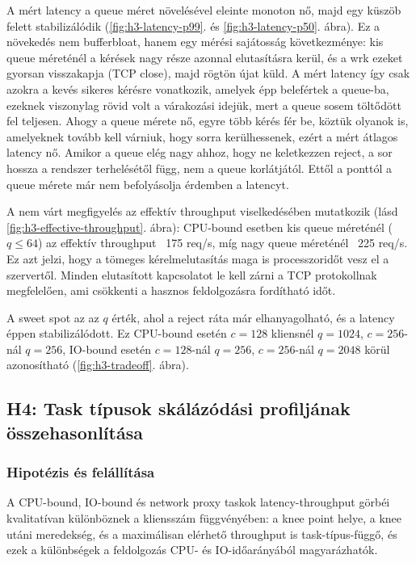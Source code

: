 \documentclass[11pt,a4paper]{article}
\begin{document}
A mért latency a queue méret növelésével eleinte monoton nő, majd egy küszöb felett
stabilizálódik (\ref{fig:h3-latency-p99}. és \ref{fig:h3-latency-p50}. ábra).
Ez a növekedés nem bufferbloat, hanem egy mérési sajátosság következménye: kis
queue méreténél a kérések nagy része azonnal elutasításra kerül, és a wrk ezeket
gyorsan visszakapja (TCP close), majd rögtön újat küld. A mért latency így csak
azokra a kevés sikeres kérésre vonatkozik, amelyek épp belefértek a queue-ba,
ezeknek viszonylag rövid volt a várakozási idejük, mert a queue sosem töltődött
fel teljesen. Ahogy a queue mérete nő, egyre több kérés fér be, köztük olyanok is,
amelyeknek tovább kell várniuk, hogy sorra kerülhessenek, ezért a mért átlagos latency nő. 
Amikor a queue elég nagy ahhoz, hogy ne keletkezzen reject, a sor hossza a rendszer terhelésétől
függ, nem a queue korlátjától. Ettől a ponttól a queue mérete már nem befolyásolja
érdemben a latencyt.


A nem várt megfigyelés az effektív throughput viselkedésében mutatkozik
(lásd \ref{fig:h3-effective-throughput}. ábra): CPU-bound esetben kis queue
méreténél ($q \leq 64$) az effektív throughput ~175 req/s, míg nagy queue
méreténél ~225 req/s. Ez azt jelzi, hogy a tömeges kérelmelutasítás maga is
processzoridőt vesz el a szervertől. Minden elutasított kapcsolatot le kell zárni
a TCP protokollnak megfelelően, ami csökkenti a hasznos feldolgozásra fordítható időt.

A sweet spot az az $q$ érték, ahol a reject ráta már elhanyagolható, és a latency
éppen stabilizálódott. Ez CPU-bound esetén $c=128$ kliensnél $q=1024$,
$c=256$-nál $q=256$, IO-bound esetén $c=128$-nál $q=256$, $c=256$-nál $q=2048$
körül azonosítható (\ref{fig:h3-tradeoff}. ábra).


\subsection{H4: Task típusok skálázódási profiljának összehasonlítása}
\label{ssec:h4}


\subsubsection{Hipotézis és felállítása}
\label{sssec:h4-hipotezis}


A CPU-bound, IO-bound és network proxy taskok latency-throughput görbéi kvalitatívan különböznek a 
kliensszám függvényében: a knee point helye, a knee utáni meredekség, és a maximálisan elérhető throughput 
is task-típus-függő, és ezek a különbségek a feldolgozás CPU- és IO-időarányából magyarázhatók.
\end{document}
